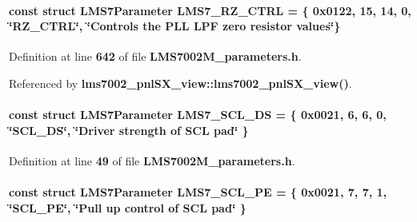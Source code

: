 \paragraph[{L\+M\+S7\+\_\+\+R\+Z\+\_\+\+C\+T\+RL}]{\setlength{\rightskip}{0pt plus 5cm}const struct {\bf L\+M\+S7\+Parameter} L\+M\+S7\+\_\+\+R\+Z\+\_\+\+C\+T\+RL = \{ 0x0122, 15, 14, 0, \char`\"{}\+R\+Z\+\_\+\+C\+T\+R\+L\char`\"{}, \char`\"{}\+Controls the P\+L\+L L\+P\+F zero resistor values\char`\"{}\}\hspace{0.3cm}{\ttfamily [static]}}\label{LMS7002M__parameters_8h_a6161225573585d8ed3ed23323b8e3685}


Definition at line {\bf 642} of file {\bf L\+M\+S7002\+M\+\_\+parameters.\+h}.



Referenced by {\bf lms7002\+\_\+pnl\+S\+X\+\_\+view\+::lms7002\+\_\+pnl\+S\+X\+\_\+view()}.

\paragraph[{L\+M\+S7\+\_\+\+S\+C\+L\+\_\+\+DS}]{\setlength{\rightskip}{0pt plus 5cm}const struct {\bf L\+M\+S7\+Parameter} L\+M\+S7\+\_\+\+S\+C\+L\+\_\+\+DS = \{ 0x0021, 6, 6, 0, \char`\"{}\+S\+C\+L\+\_\+\+D\+S\char`\"{}, \char`\"{}\+Driver strength of S\+C\+L pad\char`\"{} \}\hspace{0.3cm}{\ttfamily [static]}}\label{LMS7002M__parameters_8h_aff364d4f0059cf8f0d80a58fbba01d3a}


Definition at line {\bf 49} of file {\bf L\+M\+S7002\+M\+\_\+parameters.\+h}.

\paragraph[{L\+M\+S7\+\_\+\+S\+C\+L\+\_\+\+PE}]{\setlength{\rightskip}{0pt plus 5cm}const struct {\bf L\+M\+S7\+Parameter} L\+M\+S7\+\_\+\+S\+C\+L\+\_\+\+PE = \{ 0x0021, 7, 7, 1, \char`\"{}\+S\+C\+L\+\_\+\+P\+E\char`\"{}, \char`\"{}\+Pull up control of S\+C\+L pad\char`\"{} \}\hspace{0.3cm}{\ttfamily [static]}}\label{LMS7002M__parameters_8h_a7f0c0520f7d993d80e1af72d6d63f62b}



